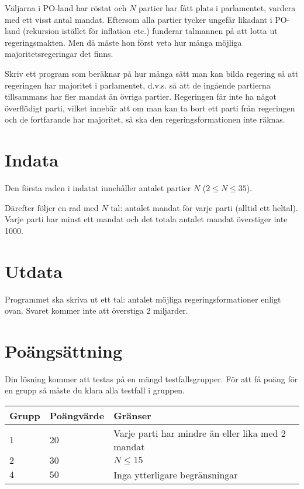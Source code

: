 
Väljarna i PO-land har röstat och $N$ partier har fått plats i parlamentet, vardera med ett
visst antal mandat. Eftersom alla partier tycker ungefär likadant i PO-land (rekursion
istället för inflation etc.) funderar talmannen på att lotta ut regeringsmakten. Men då
måste hon först veta hur många möjliga majoritetsregeringar det finns.

Skriv ett program som beräknar på hur många sätt man kan bilda regering så att regeringen
har majoritet i parlamentet, d.v.s. så att de ingående partierna tillsammans har
fler mandat än övriga partier. Regeringen får inte ha något överflödigt parti, vilket innebär
att om man kan ta bort ett parti från regeringen och de fortfarande har majoritet,
så ska den regeringsformationen inte räknas.

\section*{Indata}

Den första raden i indatat innehåller antalet partier $N$ ($2 \leq N \leq 35$).

Därefter följer en rad med $N$ tal: antalet mandat för varje parti (alltid ett heltal).
Varje parti har minst ett mandat och det totala antalet mandat överstiger inte 1000.

\section*{Utdata}

Programmet ska skriva ut ett tal: antalet möjliga regeringsformationer enligt ovan.
Svaret kommer inte att överstiga 2 miljarder.

\section*{Poängsättning}
Din lösning kommer att testas på en mängd testfallsgrupper.
För att få poäng för en grupp så måste du klara alla testfall i gruppen.

\noindent
\begin{tabular}{| l | l | p{12cm} |}
  \hline
  Grupp & Poängvärde & Gränser \\ \hline
  $1$   & $20$       & Varje parti har mindre än eller lika med $2$ mandat \\ \hline
  $2$   & $30$       & $N \leq 15$ \\ \hline
  $4$   & $50$       & Inga ytterligare begränsningar  \\ \hline
\end{tabular}